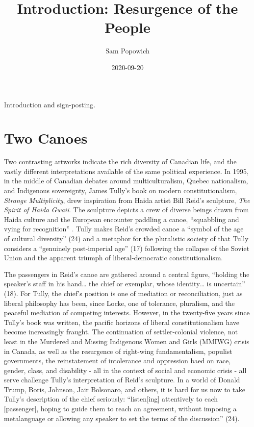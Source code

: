 \documentclass[12pt,oneside]{memoir}
\title{Introduction: Resurgence of the People}
\author{Sam Popowich}
\date{2020-09-20}
\begin{document}
\maketitle
\clearpage

\newpage
\setcounter{page}{1}

\mainmatter

Introduction and sign-posting.

\section*{Two Canoes}

Two contrasting artworks indicate the rich diversity of Canadian life, and the vastly different interpretations available of the same political experience. In 1995, in the middle of Canadian debates around multiculturalism, Quebec nationalism, and Indigenous sovereignty, James Tully’s book on modern constitutionalism, \emph{Strange Multiplicity}, drew inspiration from Haida artist Bill Reid’s sculpture, \emph{The Spirit of Haida Gwaii}. The sculpture depicts a crew of diverse beings drawn from Haida culture and the European encounter paddling a canoe, “squabbling and vying for recognition” \citep[24]{Tully1995}. Tully makes Reid’s crowded canoe a “symbol of the age of cultural diversity” (24) and a metaphor for the pluralistic society of that Tully considers a “genuinely post-imperial age” (17) following the collapse of the Soviet Union and the apparent triumph of liberal-democratic constitutionalism.

The passengers in Reid’s canoe are gathered around a central figure, “holding the speaker’s staff in his hand… the chief or exemplar, whose identity… is uncertain” (18). For Tully, the chief’s position is one of mediation or reconciliation, just as liberal philosophy has been, since Locke, one of tolerance, pluralism, and the peaceful mediation of competing interests. However, in the twenty-five years since Tully’s book was written, the pacific horizons of liberal constitutionalism have become increasingly fraught. The continuation of settler-colonial violence, not least in the Murdered and Missing Indigenous Women and Girls (MMIWG) crisis in Canada, as well as the resurgence of right-wing fundamentalism, populist governments, the reinstatement of intolerance and oppression baed on race, gender, class, and disability - all in the context of social and economic crisis - all serve challenge Tully’s interpretation of Reid’s sculpture. In a world of Donald Trump, Boris, Johnson, Jair Bolsonaro, and others, it is hard for us now to take Tully’s description of the chief seriously: “listen[ing] attentively to each [passenger], hoping to guide them to reach an agreement, without imposing a metalanguage or allowing any speaker to set the terms of the discussion” (24). 
\end{document}
